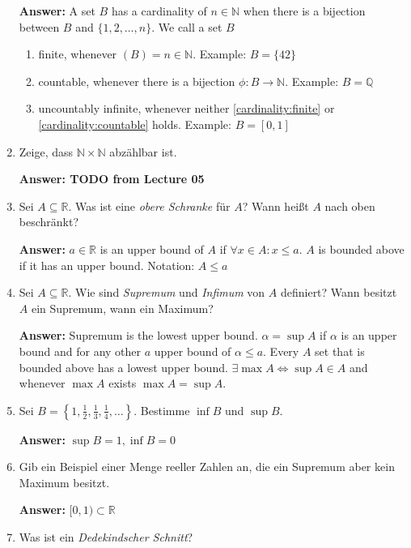 \documentclass[11pt]{article}
\newcommand{\RR}[0]{\mathbb{R}}
\newcommand{\QQ}[0]{\mathbb{Q}}
\newcommand{\NN}[0]{\mathbb{N}}
\begin{document}
\begin{enumerate}
    \textbf{Answer:} A set $B$ has a cardinality of $n \in \NN$ when there is a bijection between $B$ and $\{1, 2, \dots, n\}$. We call a set $B$
    \begin{enumerate}
        \item \label{cardinality:finite} finite, whenever $\left(B\right) = n \in \NN$. Example: $B = \{42\}$
        \item \label{cardinality:countable} countable, whenever there is a bijection $\phi: B \to \NN$. Example: $B = \QQ$
        \item uncountably infinite, whenever neither \ref{cardinality:finite} or \ref{cardinality:countable} holds. Example: $B = [0, 1]$
    \end{enumerate}

    \item Zeige, dass $\NN \times \NN$ abzählbar ist.

    \textbf{Answer: TODO from Lecture 05} 

    \item Sei $A \subseteq \RR$. Was ist eine \textit{obere Schranke} für $A$? Wann heißt $A$ nach oben beschränkt?

    \textbf{Answer:} $a \in \RR$ is an upper bound of $A$ if $\forall x\in A\colon x \le a$. $A$ is bounded above if it has an upper bound. Notation: $A \le a$

    \item Sei $A \subseteq \RR$. Wie sind \textit{Supremum} und \textit{Infimum} von $A$ definiert? Wann besitzt $A$ ein Supremum, wann ein Maximum?

    \textbf{Answer:} Supremum is the lowest upper bound. $\alpha = \sup A$ if $\alpha$ is an upper bound and for any other $a$ upper bound of $\alpha \le a$. Every $A$ set that is bounded above has a lowest upper bound. $\exists \max A \Leftrightarrow \sup A \in A$ and whenever $\max A$ exists $\max A = \sup A$.

    \item Sei $B = \left\{1, \frac{1}{2}, \frac{1}{3}, \frac{1}{4}, \dots\right\}$. Bestimme $\inf B$ und $\sup B$.

    \textbf{Answer:} $\sup B = 1, \inf B = 0$

    \item Gib ein Beispiel einer Menge reeller Zahlen an, die ein Supremum aber kein Maximum besitzt.

    \textbf{Answer:} $[0, 1) \subset \RR$

    \item Was ist ein \textit{Dedekindscher Schnitt}?


\end{enumerate}
\end{document}
